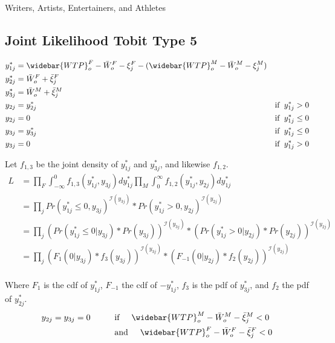 \documentclass[12pt]{article}
\begin{document}
   Writers, Artists, Entertainers, and Athletes
   
   
 \subsection{Joint Likelihood Tobit Type 5}\label{sec.likelihood}


\begin{align*}
y_{1j}^* &= \widebar{WTP}^F_o - \bar{W}^F_o  - \xi^F_j - (\widebar{WTP}^M_o - \bar{W}^M_o  - \xi^M_j) \\
y_{2j}^* &= \bar{W}^F_o + \bar{\xi}^F_j \\
y_{3j}^* &= \bar{W}^M_o + \bar{\xi}^M_j \\
y_{2j} &= y_{2j}^* \hspace{10mm} &\text{if} \hspace{2mm} y_{1j}^* >0 \\
y_{2j} &= 0 \hspace{10mm} &\text{if} \hspace{2mm} y_{1j}^* \leq 0 \\
y_{3j} &= y_{3j}^* \hspace{10mm} &\text{if} \hspace{2mm} y_{1j}^* \leq 0 \\
y_{3j} &= 0 \hspace{10mm} &\text{if} \hspace{2mm} y_{1j}^* > 0 \\
\end{align*}


Let $f_{1,3}$ be the joint density of $y_{1j}^*$ and $y_{3j}^*$, and likewise $f_{1,2}$.
\begin{align*}
L &= \prod_F \int_{-\infty}^0 f_{1,3}(y_{1j}^*,y_{3j}) dy_{1j}^* \prod_M \int_{0}^{\infty} f_{1,2}(y_{1j}^*,y_{2j}) dy_{1j}^* \\
&= \prod_j Pr(y_{1j}^* \leq 0, y_{3j})^{\mathcal{I}(y_{3j})}*Pr(y_{1j}^* > 0, y_{2j})^{\mathcal{I}(y_{2j})} \\
&= \prod_j (Pr(y_{1j}^* \leq 0 | y_{3j})*Pr(y_{3j}))^{\mathcal{I}(y_{3j})}*(Pr(y_{1j}^* > 0| y_{2j})*Pr(y_{2j}))^{\mathcal{I}(y_{2j})}\\
&= \prod_j (F_{1}(0|y_{3j})*f_3(y_{3j}))^{\mathcal{I}(y_{3j})}*(F_{-1}( 0| y_{2j})*f_2(y_{2j}))^{\mathcal{I}(y_{2j})}\\
\end{align*}

Where $F_1$ is the cdf of $y_{1j}^*$, $F_{-1}$ the cdf of $-y_{1j}^*$, $f_3$ is the pdf of $y_{3j}^*$, and $f_2$ the pdf of $y_{2j}^*$.
\begin{align*}
 y_{2j}=y_{3j}=0 \hspace{10mm} &\text{if} \hspace{5mm} \widebar{WTP}^M_o - \bar{W}^M_o - \bar{\xi}^M_j < 0\\
 &\text{and} \hspace{5mm} \widebar{WTP}^F_o - \bar{W}^F_o -  \bar{\xi}^F_j < 0 \\
\end{align*}
\end{document}
